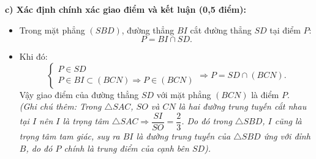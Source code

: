 \documentclass[12pt, a4paper]{article}
\begin{document}
\begin{tcolorbox}[enhanced,breakable,colback=solutionbg,colframe=secondary!50!black,frame hidden,borderline west={3pt}{0pt}{secondary!50!black}]
\textbf{c) Xác định chính xác giao điểm và kết luận (0,5 điểm):}
\begin{itemize}[leftmargin=1.5em]
\item Trong mặt phẳng $(SBD)$, đường thẳng $BI$ cắt đường thẳng $SD$ tại điểm $P$:
$$P = BI \cap SD.$$
\item Khi đó:
$$\begin{cases} P \in SD \\ P \in BI \subset (BCN) \Rightarrow P \in (BCN) \end{cases} \Rightarrow P = SD \cap (BCN).$$
Vậy giao điểm của đường thẳng $SD$ với mặt phẳng $(BCN)$ là điểm $P$.\\
\textit{(Ghi chú thêm: Trong $\triangle SAC$, $SO$ và $CN$ là hai đường trung tuyến cắt nhau tại $I$ nên $I$ là trọng tâm $\triangle SAC \Rightarrow \dfrac{SI}{SO} = \dfrac{2}{3}$. Do đó trong $\triangle SBD$, $I$ cũng là trọng tâm tam giác, suy ra $BI$ là đường trung tuyến của $\triangle SBD$ ứng với đỉnh $B$, do đó $P$ chính là trung điểm của cạnh bên $SD$).}
\end{itemize}
\end{tcolorbox}
\end{document}
